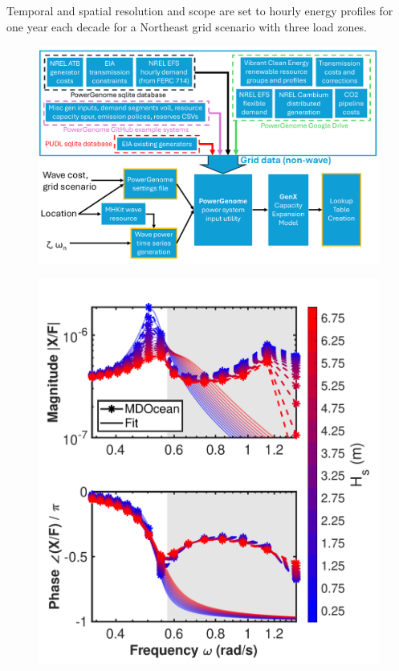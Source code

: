 \documentclass[10pt,twoside]{article}
\newif\ifplaceholder
\let\originalincludegraphics\includegraphics
\renewcommand{\includegraphics}[2][]{%
  \ifplaceholder
    \begin{tikzpicture}
      \node[anchor=south west, inner sep=0] (img) at (0,0) {\originalincludegraphics[#1]{#2}};
      \node at ($(img.south east)!0.5!(img.north west)$)
        [fill=white,opacity=0.8,text=red,font=\huge] {Placeholder};
    \end{tikzpicture}
    \vspace{-\baselineskip}
  \else
    \originalincludegraphics[#1]{#2}%
  \fi
  \placeholderfalse %
}
\begin{document}
Temporal and spatial resolution and scope are set to hourly energy profiles for one year each decade
for a Northeast %
grid scenario with three load zones.
\begin{figure}[bth]
\noindent
\begin{minipage}[b]{0.64\textwidth}
    \centering
    \includegraphics[width=\linewidth]{figures/PowerGenomeDataFlow_no_beta.pdf}
    \label{fig:CEM-data-flow}
\end{minipage}
\hfill
\begin{minipage}[b]{0.38\textwidth}
    \centering
    \includegraphics[width=\linewidth]{figures/bode_per_wave_height.pdf}
    \label{fig:bode}
\end{minipage}
\end{figure}
\end{document}
